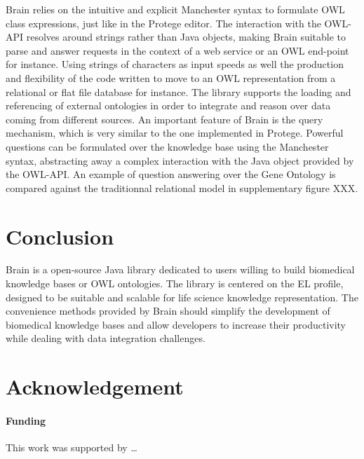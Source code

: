 \documentclass{bioinfo}
\begin{document}
Brain relies on the intuitive and explicit Manchester syntax to formulate OWL class expressions, just like in the Protege editor.
The interaction with the OWL-API resolves around strings rather than Java objects, making Brain suitable to parse and answer requests in 
the context of a web service or an OWL end-point for instance. Using strings of characters as input speeds as well the production 
and flexibility of the code written to move to an OWL representation from a relational or flat file database for instance.
The library supports the loading and referencing of external ontologies in order to integrate and reason
over data coming from different sources. An important feature of Brain is the query mechanism, which is very similar to 
the one implemented in Protege. Powerful questions can be formulated over the knowledge base using the Manchester syntax, abstracting
away a complex interaction with the Java object provided by the OWL-API. An example of question answering over the Gene Ontology
is compared against the traditionnal relational model in supplementary figure XXX.

\section{Conclusion}
Brain is a open-source Java library dedicated to users willing to build biomedical knowledge bases or OWL ontologies. 
The library is centered on the EL profile, designed to be suitable and scalable for life science knowledge representation. 
The convenience methods provided by Brain should simplify the development of biomedical knowledge bases and allow developers
to increase their productivity while dealing with data integration challenges.

\section*{Acknowledgement}
\paragraph{Funding\textcolon}
This work was supported by …
 
%  
%  
%  
%  
%  
%  
%  
%  
%  
\end{document}
